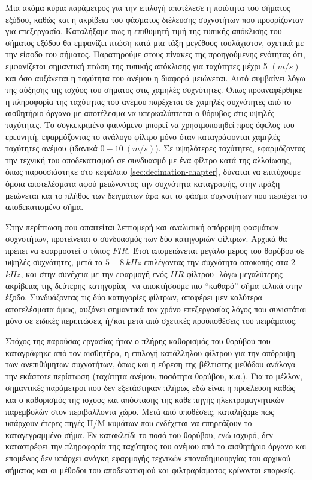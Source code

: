\documentclass[breaklines=true, 12pt]{article}
\begin{document}
Μια ακόμα κύρια παράμετρος για την επιλογή αποτέλεσε η ποιότητα του σήματος
εξόδου, καθώς και η ακρίβεια του φάσματος διέλευσης συχνοτήτων που
προορίζονταν για επεξεργασία. Καταλήξαμε πως η επιθυμητή τιμή της τυπικής
απόκλισης του σήματος εξόδου θα εμφανίζει πτώση κατά μια τάξη μεγέθους
τουλάχιστον, σχετικά με την είσοδο του σήματος. Παρατηρούμε στους πίνακες της
προηγούμενης ενότητας ότι, εμφανίζεται σημαντική πτώση της τυπικής απόκλισης
για ταχύτητες μέχρι 5 \((m/s)\) και όσο αυξάνεται η ταχύτητα του ανέμου η διαφορά
μειώνεται. Αυτό συμβαίνει λόγω της αύξησης της ισχύος του σήματος στις χαμηλές
συχνότητες. Όπως προαναφέρθηκε η πληροφορία της ταχύτητας του ανέμου παρέχεται
σε χαμηλές συχνότητες από το αισθητήριο όργανο με αποτέλεσμα να υπερκαλύπτεται
ο θόρυβος στις υψηλές ταχύτητες. Το συγκεκριμένο φαινόμενο μπορεί να
χρησιμοποιηθεί προς όφελος του ερευνητή, εφαρμόζοντας το ανάλογο
φίλτρο μόνο όταν καταγράφονται χαμηλές ταχύτητες ανέμου (ιδανικά \(0-10\ (m/s)\)).
Σε υψηλότερες ταχύτητες, εφαρμόζοντας την τεχνική του αποδεκατισμού σε συνδυασμό
με ένα φίλτρο κατά της αλλοίωσης, όπως παρουσιάστηκε στο κεφάλαιο
\ref{sec:decimation-chapter}, δύναται να επιτύχουμε όμοια αποτελέσματα αφού
μειώνοντας την συχνότητα καταγραφής, στην πράξη μειώνεται και το πλήθος των
δειγμάτων άρα και το φάσμα συχνοτήτων που περιέχει το αποδεκατισμένο σήμα.

Στην περίπτωση που απαιτείται λεπτομερή και αναλυτική απόρριψη φασμάτων
συχνοτήτων, προτείνεται ο συνδυασμός των δύο κατηγοριών φίλτρων. Αρχικά θα
πρέπει να εφαρμοστεί ο τύπος \(FIR\). Έτσι απομειώνεται μεγάλο μέρος του θορύβου
σε υψηλές συχνότητες, μετά τα \(5-8\ kHz\) επιλέγοντας την συχνότητα αποκοπής στα
2 \(kHz\), και στην συνέχεια με την εφαρμογή ενός \(IIR\) φίλτρου -λόγω μεγαλύτερης
ακρίβειας της δεύτερης κατηγορίας- να αποκτήσουμε πιο “καθαρό” σήμα τελικά στην
έξοδο. Συνδυάζοντας τις δύο κατηγορίες φίλτρων, αποφέρει μεν καλύτερα αποτελέσματα
όμως, αυξάνει σημαντικά τον χρόνο επεξεργασίας λόγος που συνιστάται μόνο σε
ειδικές περιπτώσεις ή/και μετά από σχετικές προϋποθέσεις του πειράματος.

Στόχος της παρούσας εργασίας ήταν ο πλήρης καθορισμός του θορύβου που
καταγράφηκε από τον αισθητήρα, η επιλογή κατάλληλου φίλτρου για την απόρριψη των
ανεπιθύμητων συχνοτήτων, όπως και η εύρεση της βέλτιστης μεθόδου ανάλογα την
εκάστοτε περίπτωση (ταχύτητα ανέμου, ποσότητα θορύβου, κ.α.). Για το μέλλον,
σημαντικές παράμετροι που δεν εξετάστηκαν πλήρως εδώ είναι η προέλευση καθώς και ο
καθορισμός της ισχύος και απόστασης της κάθε πηγής ηλεκτρομαγνητικών παρεμβολών
στον περιβάλλοντα χώρο. Μετά από υποθέσεις, καταλήξαμε πως υπάρχουν έτερες πηγές
Η/Μ κυμάτων που ενδέχεται να επηρεάζουν το καταγεγραμμένο σήμα. Εν κατακλείδι το
ποσό του θορύβου, ενώ ισχυρό, δεν καταστρέφει την πληροφορία της ταχύτητας του
ανέμου από το αισθητήριο όργανο και επομένως δεν υπάρχει ανάγκη εφαρμογής τεχνικών
επαναδημιουργίας του αρχικού σήματος και οι μέθοδοι του αποδεκατισμού και
φιλτραρίσματος κρίνονται επαρκείς.
\clearpage
\end{document}
